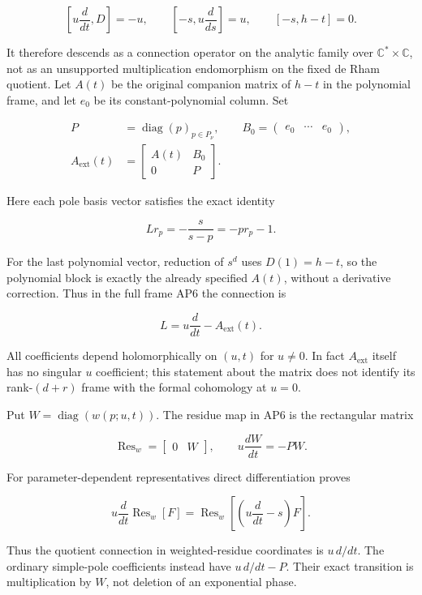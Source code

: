 \[
\left[u\frac{d}{dt},D\right]=-u,\qquad
\left[-s,u\frac{d}{ds}\right]=u,\qquad [-s,h-t]=0.
\tag{AP7}
\]

It therefore descends as a connection operator on the analytic family over \(\mathbb{C}^{*}\times\mathbb{C}\), not as an unsupported multiplication endomorphism on the fixed de Rham quotient. Let \(A(t)\) be the original companion matrix of \(h-t\) in the polynomial frame, and let \(e_0\) be its constant-polynomial column. Set

\[
\begin{aligned}
P&=\operatorname{diag}(p)_{p\in P_\nu},\qquad
B_0=\begin{pmatrix}e_0&\cdots&e_0\end{pmatrix},\\
A_{\mathrm{ext}}(t)&=\begin{bmatrix}A(t)&B_0\\0&P\end{bmatrix}.
\end{aligned}
\tag{AP8}
\]

Here each pole basis vector satisfies the exact identity

\[
L r_p=-\frac{s}{s-p}=-p r_p-1.
\tag{AP9}
\]

For the last polynomial vector, reduction of \(s^d\) uses \(D(1)=h-t\), so the polynomial block is exactly the already specified \(A(t)\), without a derivative correction. Thus in the full frame AP6 the connection is

\[
L=u\frac{d}{dt}-A_{\mathrm{ext}}(t).
\tag{AP10}
\]

All coefficients depend holomorphically on \((u,t)\) for \(u\ne0\). In fact \(A_{\mathrm{ext}}\) itself has no singular \(u\) coefficient; this statement about the matrix does not identify its rank-\((d+r)\) frame with the formal cohomology at \(u=0\).

Put \(W=\operatorname{diag}(w(p;u,t))\). The residue map in AP6 is the rectangular matrix

\[
\operatorname{Res}_w=\begin{bmatrix}0&W\end{bmatrix},\qquad
u\frac{dW}{dt}=-P W.
\tag{AP11}
\]

For parameter-dependent representatives direct differentiation proves

\[
u\frac{d}{dt}\operatorname{Res}_w[F]
=\operatorname{Res}_w\left[\left(u\frac{d}{dt}-s\right)F\right].
\tag{AP12}
\]

Thus the quotient connection in weighted-residue coordinates is \(u\,d/dt\). The ordinary simple-pole coefficients instead have \(u\,d/dt-P\). Their exact transition is multiplication by \(W\), not deletion of an exponential phase.

